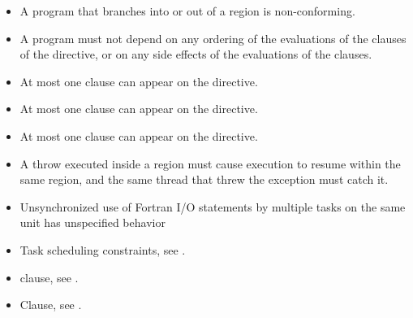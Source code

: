 \begin{itemize}
\item A program that branches into or out of a  region is non-conforming. 

\item A program must not depend on any ordering of the evaluations of the clauses of the 
 directive, or on any side effects of the evaluations of the clauses. 

\item At most one  clause can appear on the directive. 

\item At most one  clause can appear on the directive.

\item At most one  clause can appear on the directive.

\ccppspecificstart
\item A throw executed inside a  region must cause execution to resume within the 
same  region, and the same thread that threw the exception must catch it.
\ccppspecificend

\fortranspecificstart
\item Unsynchronized use of Fortran I/O statements by multiple tasks on the same unit has 
unspecified behavior
\fortranspecificend
\end{itemize}

\crossreferences
\begin{itemize}
\item Task scheduling constraints, see . 
\item {} clause, see .
\item {} Clause, see .
\end{itemize}











